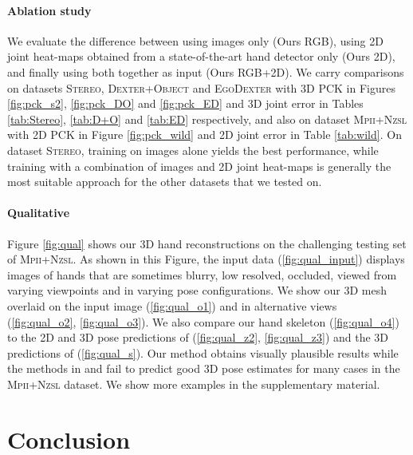 \documentclass[10pt,twocolumn,letterpaper]{article}
\begin{document}
\paragraph{Ablation study}
\vspace{-10pt}
We evaluate the difference between using images only (Ours RGB), using 2D joint heat-maps obtained from a state-of-the-art hand detector \cite{simon2017hand} only (Ours 2D), and finally using both together as input (Ours RGB+2D). We carry comparisons on datasets \textsc{Stereo}, \textsc{Dexter+Object} and \textsc{EgoDexter} with 3D PCK in Figures \ref{fig:pck_s2}, \ref{fig:pck_DO} and \ref{fig:pck_ED} and 3D joint error in Tables \ref{tab:Stereo}, \ref{tab:D+O} and \ref{tab:ED} respectively, and also on dataset \textsc{Mpii+Nzsl} with 2D PCK in Figure \ref{fig:pck_wild} and 2D joint error in Table \ref{tab:wild}. On dataset \textsc{Stereo}, training on images alone yields the best performance, while training with a combination of images and 2D joint heat-maps is generally the most suitable approach for the other datasets that we tested on. 

\paragraph{Qualitative}
\vspace{-10pt}
Figure \ref{fig:qual} shows our 3D hand reconstructions on the challenging testing set of \textsc{Mpii+Nzsl}. As shown in this Figure, the input data (\ref{fig:qual_input}) displays images of hands that are sometimes blurry, low resolved, occluded, viewed from varying viewpoints and in varying pose configurations. We show our 3D mesh overlaid on the input image (\ref{fig:qual_o1}) and in alternative views (\ref{fig:qual_o2}, \ref{fig:qual_o3}). We also compare our hand skeleton (\ref{fig:qual_o4}) to the 2D and 3D pose predictions of \cite{zimmermann2017learning} (\ref{fig:qual_z2}, \ref{fig:qual_z3}) and the 3D predictions of \cite{spurr2018cross} (\ref{fig:qual_s}). Our method obtains visually plausible results while the methods in \cite{zimmermann2017learning} and \cite{spurr2018cross} fail to predict good 3D pose estimates for many cases in the \textsc{Mpii+Nzsl} dataset. We show more examples in the supplementary material. 

\section{Conclusion}
\end{document}
